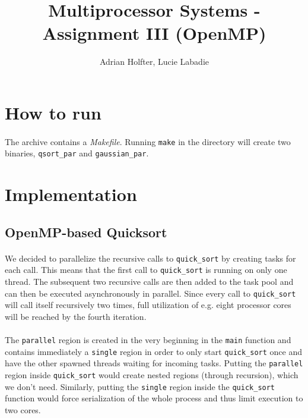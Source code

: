 \documentclass[]{article}
\title{Multiprocessor Systems - Assignment III (OpenMP)}
\author{Adrian Holfter, Lucie Labadie}
\begin{document}
\maketitle

\section{How to run}

\paragraph{} The archive contains a \emph{Makefile}. Running \texttt{make} in the directory will create two binaries, \texttt{qsort\_par} and \texttt{gaussian\_par}.

\section{Implementation}

\subsection{OpenMP-based Quicksort}

\paragraph{} We decided to parallelize the recursive calls to \texttt{quick\_sort} by creating tasks for each call. This means that the first call to \texttt{quick\_sort} is running on only one thread. The subsequent two recursive calls are then added to the task pool and can then be executed asynchronously in parallel. Since every call to \texttt{quick\_sort} will call itself recursively two times, full utilization of e.g. eight processor cores will be reached by the fourth iteration.

\paragraph{} The \texttt{parallel} region is created in the very beginning in the \texttt{main} function and contains immediately a \texttt{single} region in order to only start \texttt{quick\_sort} once and have the other spawned threads waiting for incoming tasks. Putting the \texttt{parallel} region inside \texttt{quick\_sort} would create nested regions (through recursion), which we don't need. Similarly, putting the \texttt{single} region inside the \texttt{quick\_sort} function would force serialization of the whole process and thus limit execution to two cores.
\end{document}
